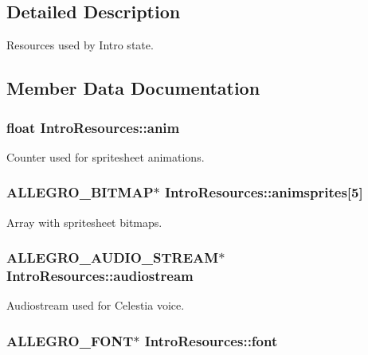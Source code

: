 \subsection{Detailed Description}
Resources used by Intro state. 

\subsection{Member Data Documentation}
\hypertarget{structIntroResources_ab6c183c7319b9b7f4f6b144708d36d62}{
\subsubsection[{anim}]{\setlength{\rightskip}{0pt plus 5cm}float Intro\+Resources\+::anim}}\label{structIntroResources_ab6c183c7319b9b7f4f6b144708d36d62}
Counter used for spritesheet animations. \hypertarget{structIntroResources_a7dc3ddca5f89f0f1bab100d3c544ebb8}{
\subsubsection[{animsprites}]{\setlength{\rightskip}{0pt plus 5cm}A\+L\+L\+E\+G\+R\+O\+\_\+\+B\+I\+T\+M\+A\+P$\ast$ Intro\+Resources\+::animsprites\mbox{[}5\mbox{]}}}\label{structIntroResources_a7dc3ddca5f89f0f1bab100d3c544ebb8}
Array with spritesheet bitmaps. \hypertarget{structIntroResources_a4ba25de04dcc54b16335dd0ffe2481f4}{
\subsubsection[{audiostream}]{\setlength{\rightskip}{0pt plus 5cm}A\+L\+L\+E\+G\+R\+O\+\_\+\+A\+U\+D\+I\+O\+\_\+\+S\+T\+R\+E\+A\+M$\ast$ Intro\+Resources\+::audiostream}}\label{structIntroResources_a4ba25de04dcc54b16335dd0ffe2481f4}
Audiostream used for Celestia voice. \hypertarget{structIntroResources_ae5a5f94b2f031b3ee9e6aa651e6ee029}{
\subsubsection[{font}]{\setlength{\rightskip}{0pt plus 5cm}A\+L\+L\+E\+G\+R\+O\+\_\+\+F\+O\+N\+T$\ast$ Intro\+Resources\+::font}}\label{structIntroResources_ae5a5f94b2f031b3ee9e6aa651e6ee029}
